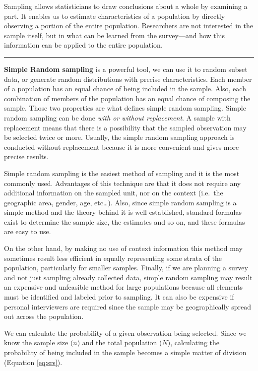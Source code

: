 \documentclass[
]{article}
\begin{document}
Sampling allows statisticians to draw conclusions about a whole by
examining a part. It enables us to estimate characteristics of a
population by directly observing a portion of the entire population.
Researchers are not interested in the sample itself, but in what can be
learned from the survey---and how this information can be applied to the
entire population.

\begin{center}\rule{0.5\linewidth}{0.5pt}\end{center}

\textbf{Simple Random sampling} is a powerful tool, we can use it to random
subset data, or generate random distributions with precise
characteristics. Each member of a population has an equal chance of
being included in the sample. Also, each combination of members of the
population has an equal chance of composing the sample. Those two
properties are what defines simple random sampling. Simple random
sampling can be done \emph{with or without replacement}. A sample with
replacement means that there is a possibility that the sampled
observation may be selected twice or more. Usually, the simple random
sampling approach is conducted without replacement because it is more
convenient and gives more precise results.

Simple random sampling is the easiest method of sampling and it is the
most commonly used. Advantages of this technique are that it does not
require any additional information on the sampled unit, nor on the
context (i.e.~the geographic area, gender, age, etc\ldots). Also, since
simple random sampling is a simple method and the theory behind it is
well established, standard formulas exist to determine the sample size,
the estimates and so on, and these formulas are easy to use.

On the other hand, by making no use of context information this method
may sometimes result less efficient in equally representing some strata
of the population, particularly for smaller samples. Finally, if we are
planning a survey and not just sampling already collected data, simple
random sampling may result an expensive and unfeasible method for large
populations because all elements must be identified and labeled prior to
sampling. It can also be expensive if personal interviewers are required
since the sample may be geographically spread out across the population.

We can calculate the probability of a given observation being selected.
Since we know the sample size (\(n\)) and the total population (\(N\)),
calculating the probability of being included in the sample becomes a
simple matter of division (Equation \eqref{eq:srs}).
\end{document}
